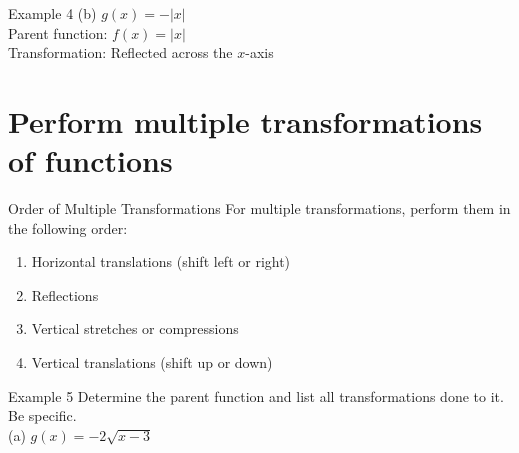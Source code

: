 \documentclass[t]{beamer}
\begin{document}
\begin{frame}{Example 4}
(b) \quad $g(x) = -|x|$	\newline\\	\pause
Parent function: $f(x) = |x|$ \newline\\ \pause
Transformation: Reflected across the $x$-axis
\end{frame}

\section{Perform multiple transformations of functions}

\begin{frame}{Order of Multiple Transformations}
For multiple transformations, perform them in the following order:	\newline\\	\pause
\begin{enumerate}
\item<+-> Horizontal translations (shift left or right) \newline\\
\item<+-> Reflections \newline\\
\item<+-> Vertical stretches or compressions \newline\\ 
\item<+-> Vertical translations (shift up or down)	\newline\\
\end{enumerate}
\end{frame}

\begin{frame}{Example 5}
Determine the parent function and list all transformations done to it. Be specific.	\newline\\
(a) \quad $g(x) = -2\sqrt{x-3}$ \newline\\
 \newline\\
 \newline\\
 \newline\\
\end{frame}
\end{document}
